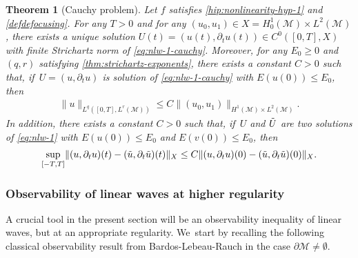 \documentclass[JEP,XML,SOM,Unicode,published]{cedram}
\newtheorem{theorem}{Theorem}[section]
\theoremstyle{definition}
\let\mc\mathcal
\newcommand{\M}{\mc{M}}
\providecommand{\norm}[1]{\lVert#1\rVert}
\begin{document}
\begin{theorem}[Cauchy problem]\label{thm:cauchy-problem}
Let $f$ satisfies \eqref{hip:nonlinearity-hyp-1} and \eqref{defdefocusing}. For any $T>0$ and for any $(u_0, u_1)\in X=H_0^1(\M)\times L^2(\M)$, there exists a unique solution $U(t)=(u(t), \partial_t u(t))\in C^0([0, T], X)$ with finite Strichartz norm of \eqref{eq:nlw-1-cauchy}. Moreover, for any $E_0\geq 0$ and $(q, r)$ satisfying \eqref{thm:strichartz-exponents}, there exists a constant $C>0$ such that, if~$U=(u, \partial_t u)$ is solution of \eqref{eq:nlw-1-cauchy} with $E(u(0))\leq E_0$, then
\begin{align*}
\norm{u}_{L^q([0, T], L^r(\M))}\leq C\norm{(u_0, u_1)}_{H^1(\M)\times L^2(\M)}.
\end{align*}
In addition, there exists a constant $C>0$ such that, if~$U$ and $\Tilde{U}$ are two solutions of \eqref{eq:nlw-1} with $E(u(0))\leq E_0$ and $E(v(0))\leq E_0$, then
\begin{align*}
\sup_{[-T, T]}\norm{(u, \partial_t u)(t)-(\Tilde{u}, \partial_t \Tilde{u})(t)}_X\leq C\norm{(u, \partial_t u)(0)-(\Tilde{u}, \partial_t \Tilde{u})(0)}_X.
\end{align*}
\end{theorem}

\subsubsection{Observability of linear waves at higher regularity} A crucial tool in the present section will be an observability inequality of linear waves, but at an appropriate regularity. We~start by recalling the following classical observability result from Bardos-Lebeau-Rauch \cite{BLR:88} in the case $\partial\M\neq\emptyset$.
\end{document}
